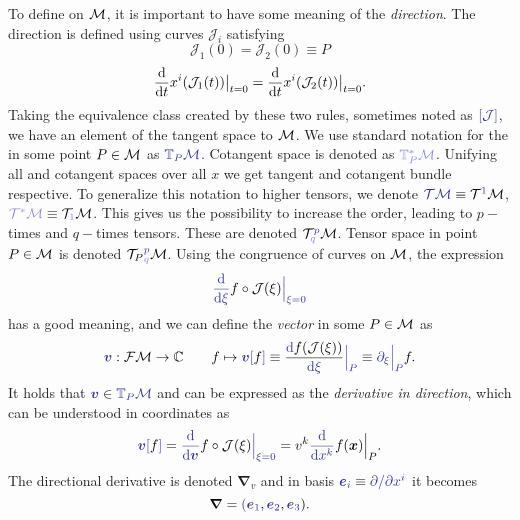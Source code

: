 To define  on $\mathcal{M}$, it is important to have some meaning of the \emph{direction}. The direction is defined using curves $\mathcal J_i$ satisfying 
$$\mathcal J_1(0)=\mathcal J_2(0)\equiv P$$
$$\frac{\mathrm{d} }{\mathrm{d} t}x^i(\mathcal J_1(t))\big|_{t=0}=\frac{\mathrm{d} }{\mathrm{d} t}x^i(\mathcal J_2(t))\big|_{t=0}.$$
Taking the equivalence class created by these two rules, sometimes noted as $\bluee{[\mathcal J]}$, we have an element of the tangent space to $\mathcal{M}$. We use standard notation for the  in some point $P\in\mathcal{M}$ as $\bluee{\T_P\M}$. Cotangent space is denoted as $\blueee{\T^*_P\M}$. Unifying all  and cotangent spaces over all $x$ we get tangent \bluee{$\TT\M$} and cotangent \blueee{$\TT^*\M$} bundle respective. To generalize this notation to higher tensors, we denote $\bluee{\TT\M}\equiv\TT^{\bluee{1}}\M$, $\blueee{\TT^*\M}\equiv \TT_{\blueee{1}}\M$. This gives us the possibility to increase the order, leading to $p-$times  and $q-$times  tensors. These are denoted $\TT^{\bluee p}_{\blueee q} \M$. Tensor space in point $P\in\mathcal{M}$ is denoted ${\TT_P}^{\bluee p}_{\blueee q} \M$.
Using the congruence of curves on $\mathcal{M}$, the expression 
\begin{equation}
    \bluee{\der{}{\xi}}f\circ \mathcal J(\xi)\bluee{\Big|_{\xi=0}}
\end{equation}
has a good meaning, and we can define the \emph{vector} in some $P\in\mathcal{M}$ as
\begin{equation}
    \bluee{\bm v}: \FM\rightarrow \C \qquad f\mapsto \bluee{\bm v[}f\bluee ]\equiv \frac{\bluee \d f(\mathcal J(\xi))}{\bluee{\d \xi}}\bluee{\Big|_P} \equiv \bluee{\partial_\xi\Big|_P} f .
\end{equation}
It holds that $\bluee{\bm v}\in \bluee{\T_P\M}$ and can be expressed as the \emph{derivative in direction},
which can be understood in coordinates as
\begin{equation}
    \bluee{\bm v[}f\bluee ] = \bluee{\der{}{\bm v}} f\circ \mathcal J(\xi)\bluee{\Big|_{\xi=0}}=v^k\bluee{\der{}{x^k}} f(\bm x)\Big|_{P}.
\end{equation}
The directional derivative is denoted $\bm\nabla_v$
and in basis $\bluee{\bm e_i} \equiv \bluee{\partial/\partial x^i}$ it becomes
$$\bm\nabla=\bluee(\bluee{\bm e_1}, \bluee{\bm e_2},\bluee{\bm e_3}).$$


